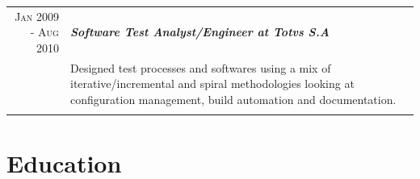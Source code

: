 \documentclass[a4paper,10pt]{article} %
\begin{document}
\begin{longtable}{r|p{11cm}}
\\
\textsc{Jan 2009 - Aug 2010} & \emph{\bf Software Test Analyst/Engineer
at Totvs S.A} \\
& \footnotesize{Designed test processes and softwares using a mix
of iterative/incremental and spiral methodologies looking at
configuration management, build automation and documentation.} \\
\multicolumn{2}{c}{} \\

\end{longtable}



\section{Education}
\end{document}
